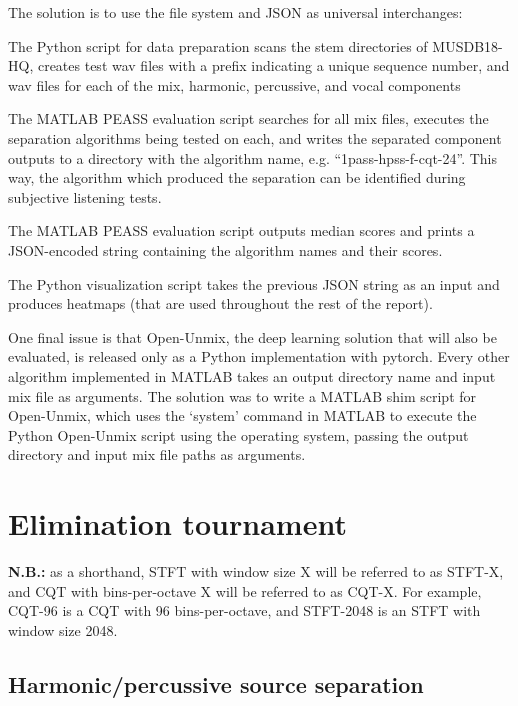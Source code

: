 \documentclass[10pt,letter]{article}
\newenvironment{tight_enumerate}{
\begin{enumerate}
\setlength{\itemsep}{0pt}
\setlength{\parskip}{0pt}
}{\end{enumerate}}
\begin{document}
The solution is to use the file system and JSON as universal interchanges:
\begin{tight_enumerate}
\vspace{-0.5em}
\item
	The Python script for data preparation scans the stem directories of MUSDB18-HQ, creates test wav files with a prefix indicating a unique sequence number, and wav files for each of the mix, harmonic, percussive, and vocal components
\item
	The MATLAB PEASS evaluation script searches for all mix files, executes the separation algorithms being tested on each, and writes the separated component outputs to a directory with the algorithm name, e.g. ``1pass-hpss-f-cqt-24''. This way, the algorithm which produced the separation can be identified during subjective listening tests.
\item
	The MATLAB PEASS evaluation script outputs median scores and prints a JSON-encoded string containing the algorithm names and their scores.
\item
	The Python visualization script takes the previous JSON string as an input and produces heatmaps (that are used throughout the rest of the report).
\end{tight_enumerate}

One final issue is that Open-Unmix, the deep learning solution that will also be evaluated, is released only as a Python implementation with pytorch\cite{pytorch}. Every other algorithm implemented in MATLAB takes an output directory name and input mix file as arguments. The solution was to write a MATLAB shim script for Open-Unmix, which uses the `system' command in MATLAB to execute the Python Open-Unmix script using the operating system, passing the output directory and input mix file paths as arguments.

\section{Elimination tournament}
\label{sec:elim}

\textbf{N.B.:} as a shorthand, STFT with window size X will be referred to as STFT-X, and CQT with bins-per-octave X will be referred to as CQT-X. For example, CQT-96 is a CQT with 96 bins-per-octave, and STFT-2048 is an STFT with window size 2048.

\subsection{Harmonic/percussive source separation}
\end{document}
